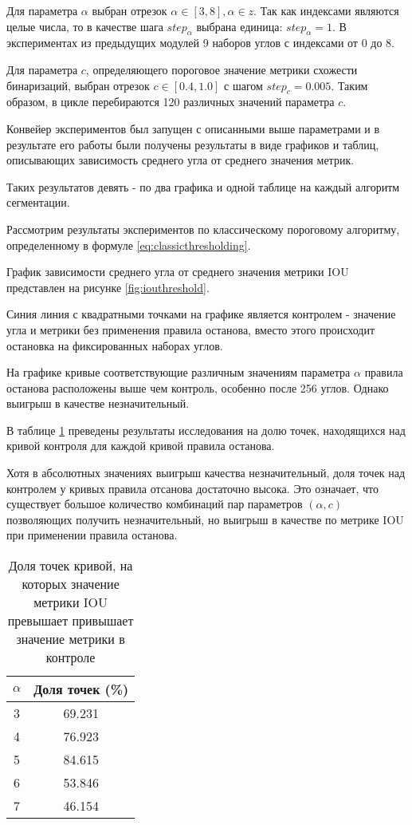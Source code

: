 Для параметра \(\alpha\) выбран отрезок \(\alpha \in [3, 8], \alpha \in z\). Так как индексами являются целые числа, то в качестве шага \(step_{\alpha}\) выбрана единица: \(step_{\alpha} = 1\). В экспериментах из предыдущих модулей 9 наборов углов с индексами от 0 до 8.

Для параметра \(c\), определяющего пороговое значение метрики схожести бинаризаций, выбран отрезок \(c \in [0.4, 1.0]\) с шагом \(step_c = 0.005\). Таким образом, в цикле перебираются 120 различных значений параметра \(c\).

Конвейер экспериментов был запущен с описанными выше параметрами и в результате его работы были получены результаты в виде графиков и таблиц, описывающих зависимость среднего угла от среднего значения метрик. 

Таких результатов девять - по  два графика и одной таблице на каждый алгоритм сегментации.

Рассмотрим результаты экспериментов по классическому пороговому алгоритму, определенному в формуле \ref*{eq:classicthresholding}.

График зависимости среднего угла от среднего значения метрики IOU представлен на рисунке \ref*{fig:iouthreshold}.


Синия линия с квадратными точками на графике является контролем - значение угла и метрики без применения правила останова, вместо этого происходит остановка на фиксированных наборах углов.

На графике кривые соответствующие различным значениям параметра \(\alpha\) правила останова расположены выше чем контроль, особенно после 256 углов. Однако выигрыш в качестве незначительный.

В таблице \ref*{tab:thresholdingiou} преведены результаты исследования на долю точек, находящихся над кривой контроля для каждой кривой правила останова.

Хотя в абсолютных значениях выигрыш качества незначительный, доля точек над контролем у кривых правила отсанова достаточно высока. Это означает, что существует большое количество комбинаций пар параметров \((\alpha, c)\) позволяющих получить незначительный, но выигрыш в качестве по метрике IOU при применении правила останова. 


\begin{table}[H]
\centering
\caption{Доля точек кривой, на которых значение метрики IOU превышает привышает значение метрики в  контроле}
\label{tab:thresholdingiou}
\begin{tabular}{|c|c|}
\hline
\(\alpha\) & Доля точек (\%) \\
\hline
3 & 69.231 \\
4 & 76.923 \\
5 & 84.615 \\
6 & 53.846 \\
7 & 46.154 \\
\hline
\end{tabular}
\end{table}

